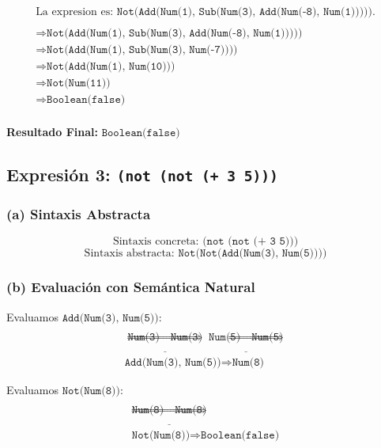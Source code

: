 \documentclass[12pt,letterpaper]{article}
\begin{document}
\[
\begin{array}{c}
\text{La expresion es: } \texttt{Not(Add(Num(1), Sub(Num(3), Add(Num(-8), Num(1)))))}. \\
\\
\Rightarrow \texttt{Not(Add(Num(1), Sub(Num(3), Add(Num(-8), Num(1)))))} \\
\Rightarrow \texttt{Not(Add(Num(1), Sub(Num(3), Num(-7))))} \\
\Rightarrow \texttt{Not(Add(Num(1), Num(10)))} \\
\Rightarrow \texttt{Not(Num(11))} \\
\Rightarrow \texttt{Boolean(false)} \\

\end{array}
\]

\textbf{Resultado Final:} \(\texttt{Boolean(false)}\)

\subsection*{Expresión 3: \texttt{(not (not (+ 3 5)))}}

\subsubsection*{(a) Sintaxis Abstracta}
\[
\text{Sintaxis concreta: } \texttt{(not (not (+ 3 5)))}
\]
\[
\text{Sintaxis abstracta: } \texttt{Not(Not(Add(Num(3), Num(5))))}
\]

\subsubsection*{(b) Evaluación con Semántica Natural}

Evaluamos \(\texttt{Add(Num(3), Num(5))}\):
\[
\begin{array}{c}
\\
\underline{\texttt{Num(3)} \Rightarrow \texttt{Num(3)}}
\underline{\texttt{Num(5)} \Rightarrow \texttt{Num(5)}} \\
\texttt{Add(Num(3), Num(5))} \Rightarrow \texttt{Num(8)}
\end{array}
\]

Evaluamos \(\texttt{Not(Num(8))}\):
\[
\begin{array}{c}
\\
\underline{\texttt{Num(8)} \Rightarrow \texttt{Num(8)}} \\
\texttt{Not(Num(8))} \Rightarrow \texttt{Boolean(false)}
\end{array}
\]
\end{document}
